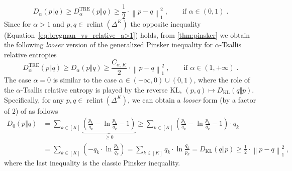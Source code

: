 \documentclass[11pt,oneside,a4paper]{article}
\newcommand{\lrb}[1]{\left(#1\right)}
\newcommand{\lno}[1]{\left\lVert#1\right\rVert}
\theoremstyle{plain}
\theoremstyle{definition}
\theoremstyle{remark}
\newcommand{\simplex}[1]{\Delta^{#1}}
\DeclareMathOperator*{\relint}{relint}
\newcommand{\KL}{D_{\mathrm{KL}}}
\begin{document}
{\[
    D_\alpha(p\Vert q)
\ge
    D^{\textrm{TRE}}_\alpha(p \Vert q)
\ge
    \frac{1}{2} \cdot\lno{p-q}_1^2\;, \qquad \textrm{if $\alpha \in (0,1)$}\;.
\]
Since for $\alpha > 1$ and $p,q \in \relint(\simplex{K})$ the opposite inequality (Equation~\ref{eq:bregman_vs_relative_a>1}) holds, from \cref{thm:pinsker} we obtain the following \emph{looser} version of the generalized Pinsker inequality for $\alpha$-Tsallis relative entropies  
\[
    D^{\textrm{TRE}}_\alpha(p \Vert q)
\ge
    D_\alpha(p\Vert q)
\ge
    \frac{C_{\alpha,K}}{2} \cdot \lno{p-q}_1^2\;, \qquad \textrm{if $\alpha \in (1,+\infty)$}\;.
\]
The case $\alpha = 0$ is similar to the case $\alpha \in (-\infty,0)\cup (0,1)$, where the role of the $\alpha$-Tsallis relative entropy is played by the reverse KL, $(p,q) \mapsto \KL(q\Vert p)$.
Specifically, for any $p,q \in \relint(\simplex{K})$, we can obtain a \emph{looser} form (by a factor of $2$) of  as follows
\begin{align*}    
    D_0(p\Vert q)
&=
    \sum_{k \in [K]}\underbrace{\lrb{ \frac{p_k}{q_k}-\ln \frac{p_k}{q_k} -1}}_{\ge 0}
\ge
    \sum_{k \in [K]}\lrb{ \frac{p_k}{q_k}-\ln \frac{p_k}{q_k} -1}\cdot q_k
\\
&=
    \sum_{k \in [K]}\lrb{ -q_k\cdot\ln \frac{p_k}{q_k} }
=
    \sum_{k \in [K]}q_k\cdot\ln \frac{q_k}{p_k}
=
    \KL(q\Vert p)
\ge
    \frac{1}{2}\cdot\lno{p-q}_1^2\;,
\end{align*}
where the last inequality is the classic Pinsker inequality.
}
\end{document}

